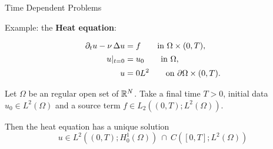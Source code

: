 \begin{frame}{Time Dependent Problems}
  \begin{small}
    Example: the \textbf{Heat equation}:
  \end{small}
  \begin{BlockNoTitle}%
    \begin{equation*}
        \begin{aligned}%
          \dt u - \nu\, \Delta u &= f
          \qquad \text{in} \ \Omega\times (0,T),
          \\[0.1em]
          u|_{t=0} &= u_0
          \qquad \text{in}\ \Omega,
          \\[0.1em]
          u&=0L^2
          \qquad \text{on}\ \partial\Omega \times (0,T).
        \end{aligned}
      \end{equation*}
  \end{BlockNoTitle}
  \begin{theorem}
    Let $\Omega$ be an regular open set of ${\mathbb R}^N$. Take a final
    time $T>0$, initial data $u_0\in L^2(\Omega)$ and a source term
    $f\in L_2( (0,T); L^2(\Omega))$.
    \par\medskip
    Then \alert{the heat equation has a unique solution}
    $$
    u\in L^2( (0,T); H_0^1(\Omega)) \ \cap \ C([0,T];L^2(\Omega))
    $$
  \end{theorem}
\end{frame}


